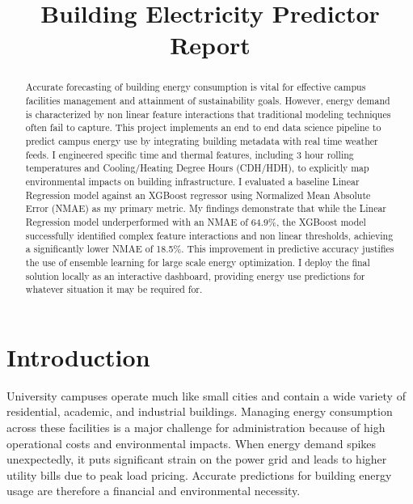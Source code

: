 \documentclass[conference]{IEEEtran}
\begin{document}
\title{Building Electricity Predictor \\ Report}



\author{
}

\maketitle

\begin{abstract}
Accurate forecasting of building energy consumption is vital for effective campus facilities management and attainment of sustainability goals. However, energy demand is characterized by non linear feature interactions that traditional modeling techniques often fail to capture. This project implements an end to end data science pipeline to predict campus energy use by integrating building metadata with real time weather feeds. I engineered specific time and thermal features, including 3 hour rolling temperatures and Cooling/Heating Degree Hours (CDH/HDH), to explicitly map environmental impacts on building infrastructure. I evaluated a baseline Linear Regression model against an XGBoost regressor using Normalized Mean Absolute Error (NMAE) as my primary metric. My findings demonstrate that while the Linear Regression model underperformed with an NMAE of 64.9\%, the XGBoost model successfully identified complex feature interactions and non linear thresholds, achieving a significantly lower NMAE of 18.5\%. This improvement in predictive accuracy justifies the use of ensemble learning for large scale energy optimization. I deploy the final solution locally as an interactive dashboard, providing energy use predictions for whatever situation it may be required for.
\end{abstract}



\section{Introduction}
University campuses operate much like small cities and contain a wide variety of residential, academic, and industrial buildings. Managing energy consumption across these facilities is a major challenge for administration because of high operational costs and environmental impacts. When energy demand spikes unexpectedly, it puts significant strain on the power grid and leads to higher utility bills due to peak load pricing. Accurate predictions for building energy usage are therefore a financial and environmental necessity. 
\end{document}
